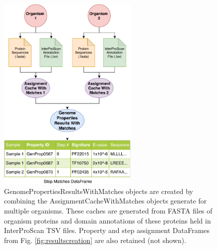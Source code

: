 \begin{figure}[!ht]
  \centering
	\includegraphics[width=0.60\textwidth]{media/assignment_results_with_matches_overview.pdf}
	 \caption{GenomePropertiesResultsWithMatches objects are created by combining the AssignmentCacheWithMatches objects generate for multiple organisms. These caches are generated from FASTA files of organism proteins and domain annotations of these proteins held in InterProScan TSV files. Property and step assignment DataFrames from  Fig. \ref{fig:resultscreation} are also retained (not shown).}
	 \label{fig:resultswithmatchescreation}
\end{figure}

